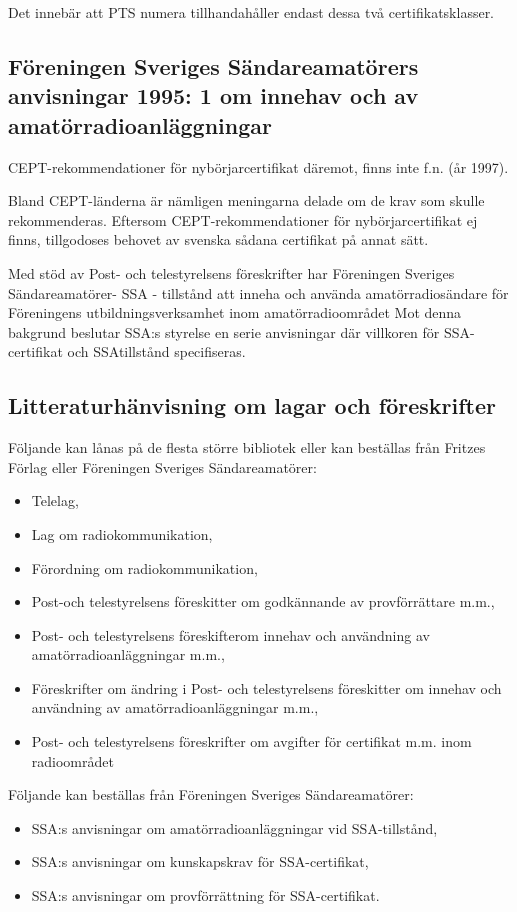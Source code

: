 Det innebär att PTS numera tillhandahåller endast dessa två
certifikatsklasser.

\subsection{Föreningen Sveriges Sändareamatörers anvisningar 1995: 1 om innehav
  och av amatörradioanläggningar}

CEPT-rekommendationer för nybörjarcertifikat däremot, finns inte
f.n. (år 1997).

Bland CEPT-länderna är nämligen meningarna delade om de krav som
skulle rekommenderas. Eftersom CEPT-rekommendationer för
nybörjarcertifikat ej finns, tillgodoses behovet av svenska sådana
certifikat på annat sätt.

Med stöd av Post- och telestyrelsens föreskrifter har Föreningen
Sveriges Sändareamatörer- SSA - tillstånd att inneha och använda
amatörradiosändare för Föreningens utbildningsverksamhet inom
amatörradioområdet Mot denna bakgrund beslutar SSA:s styrelse en serie
anvisningar där villkoren för SSA-certifikat och SSAtillstånd
specifiseras.

\subsection{Litteraturhänvisning om lagar och föreskrifter}

Följande kan lånas på de flesta större bibliotek eller kan beställas
från Fritzes Förlag eller Föreningen Sveriges Sändareamatörer:
\begin{itemize}
\item Telelag,
\item Lag om radiokommunikation,
\item Förordning om radiokommunikation,
\item Post-och telestyrelsens föreskitter om godkännande av
  provförrättare m.m.,
\item Post- och telestyrelsens föreskifterom innehav och användning av
  amatörradioanläggningar m.m.,
\item Föreskrifter om ändring i Post- och telestyrelsens föreskitter
  om innehav och användning av amatörradioanläggningar m.m.,
\item Post- och telestyrelsens föreskrifter om avgifter för certifikat
  m.m. inom radioområdet
\end{itemize}

Följande kan beställas från Föreningen Sveriges Sändareamatörer:
\begin{itemize}
\item SSA:s anvisningar om amatörradioanläggningar vid SSA-tillstånd,
\item SSA:s anvisningar om kunskapskrav för SSA-certifikat,
\item SSA:s anvisningar om provförrättning för SSA-certifikat.
\end{itemize}
